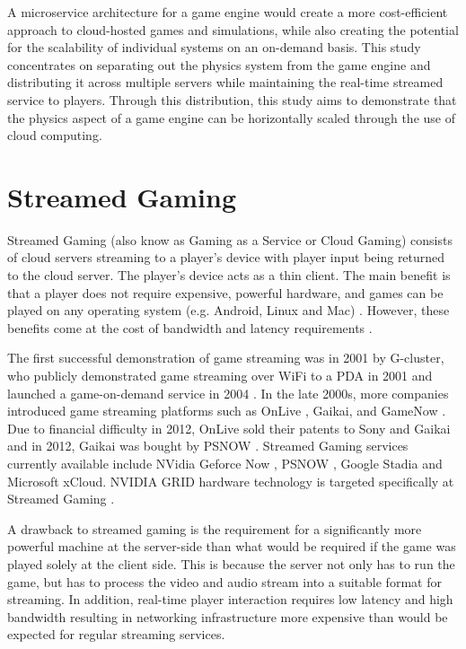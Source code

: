 A microservice architecture for a game engine would create a more cost-efficient approach to cloud-hosted games and simulations, while also creating the potential for the scalability of individual systems on an on-demand basis. This study concentrates on separating out the physics system from the game engine and distributing it across multiple servers while maintaining the real-time streamed service to players. Through this distribution, this study aims to demonstrate that the physics aspect of a game engine can be horizontally scaled through the use of cloud computing.

\section{Streamed Gaming}

Streamed Gaming (also know as Gaming as a Service or Cloud Gaming) consists of cloud servers streaming to a player's device with player input being returned to the cloud server. The player's device acts as a thin client. The main benefit is that a player does not require expensive, powerful hardware, and games can be played on any operating system (e.g. Android, Linux and Mac) \cite{D_Angelo_2015}. However, these benefits come at the cost of bandwidth and latency requirements \cite{iCloudAccess}.

The first successful demonstration of game streaming was in 2001 by G-cluster, who publicly demonstrated game streaming over WiFi to a PDA in 2001 and launched a game-on-demand service in 2004 \cite{2016SurveyOnCloudGaming}. In the late 2000s, more companies introduced game streaming platforms such as OnLive \cite{OnLive}, Gaikai, and GameNow \cite{GameNow}. Due to financial difficulty in 2012, OnLive sold their patents to Sony and Gaikai and in 2012, Gaikai was bought by PSNOW \cite{PSNOW}.
Streamed Gaming services currently available include NVidia Geforce Now \cite{NVidiaGameStream}, PSNOW \cite{PSNOW}, Google Stadia\cite{Stadia} and Microsoft xCloud\cite{xCloud}. NVIDIA GRID hardware technology is targeted specifically at Streamed Gaming \cite{NVIDIACloud}.

A drawback to streamed gaming is the requirement for a significantly more powerful machine at the server-side than what would be required if the game was played solely at the client side. This is because the server not only has to run the game, but has to process the video and audio stream into a suitable format for streaming. In addition, real-time player interaction requires low latency and high bandwidth resulting in networking infrastructure more expensive than would be expected for regular streaming services. 

